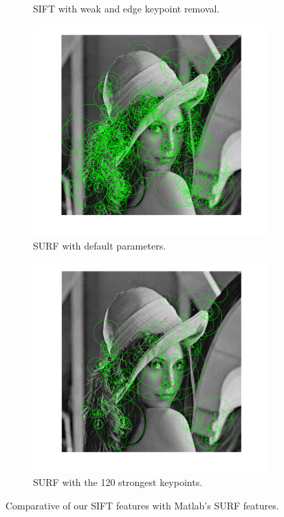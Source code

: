 \documentclass[12pt]{article}
\begin{document}
\begin{figure}[htbp!]
\begin{subfigure}[b]{0.49\textwidth}
                \caption{SIFT with weak and edge keypoint removal.}
                \label{fig:sift2}
        \end{subfigure}
        \begin{subfigure}[b]{0.49\textwidth}
                \includegraphics[width=\textwidth]{images/surf1}
                \caption{SURF with default parameters.}
                \label{fig:surf1}
        \end{subfigure}
        \begin{subfigure}[b]{0.49\textwidth}
                \includegraphics[width=\textwidth]{images/surf2}
                \caption{SURF with the 120 strongest keypoints.}
                \label{fig:surf2}
        \end{subfigure}        
        \caption{Comparative of our SIFT features with Matlab's SURF features.}\label{fig:featuresSample}
\end{figure}
\end{document}
